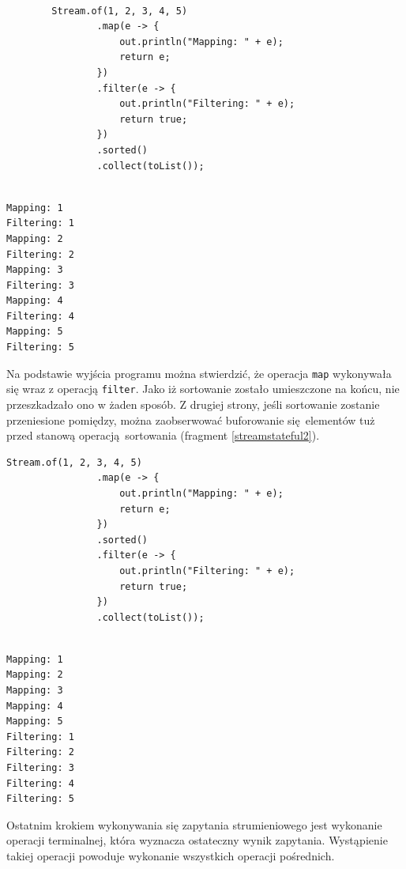 \documentclass[12pt]{extarticle}
\begin{document}
\begin{lstlisting}[label=streamstateful1, caption=Fuzja operacji bezstanowych]

        Stream.of(1, 2, 3, 4, 5)
                .map(e -> {
                    out.println("Mapping: " + e);
                    return e;
                })
                .filter(e -> {
                    out.println("Filtering: " + e);
                    return true;
                })
                .sorted()
                .collect(toList());
\end{lstlisting}


\begin{verbatim}

Mapping: 1
Filtering: 1
Mapping: 2
Filtering: 2
Mapping: 3
Filtering: 3
Mapping: 4
Filtering: 4
Mapping: 5
Filtering: 5

\end{verbatim}

    Na podstawie wyjścia programu można stwierdzić, że operacja \texttt{map} wykonywała się wraz z operacją \texttt{filter}. Jako iż sortowanie zostało umieszczone na końcu, nie przeszkadzało ono w żaden sposób. Z drugiej strony, jeśli sortowanie zostanie przeniesione pomiędzy, można zaobserwować buforowanie się elementów tuż przed stanową operacją sortowania (fragment \ref{streamstateful2}).

\begin{lstlisting}[label=streamstateful2, caption=Brak fuzji operacji stanowych]
        Stream.of(1, 2, 3, 4, 5)
                .map(e -> {
                    out.println("Mapping: " + e);
                    return e;
                })
                .sorted()
                .filter(e -> {
                    out.println("Filtering: " + e);
                    return true;
                })
                .collect(toList());
\end{lstlisting}

\begin{verbatim}

Mapping: 1
Mapping: 2
Mapping: 3
Mapping: 4
Mapping: 5
Filtering: 1
Filtering: 2
Filtering: 3
Filtering: 4
Filtering: 5

\end{verbatim}

    Ostatnim krokiem wykonywania się zapytania strumieniowego jest wykonanie operacji terminalnej, która wyznacza ostateczny wynik zapytania. Wystąpienie takiej operacji powoduje wykonanie wszystkich operacji pośrednich. 
\end{document}
